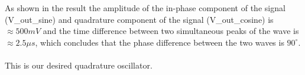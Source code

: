 As shown in the result the amplitude of the in-phase component of the signal (V\_out\_sine) and quadrature component of the signal (V\_out\_cosine) is $\approx 500 mV$ and the time difference between two simultaneous peaks of the wave is $\approx 2.5 \mu s$, which concludes that the phase difference between the two waves is $90^\circ$.\\
\\
This is our desired quadrature oscillator.